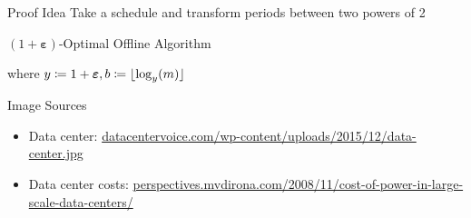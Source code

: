 \documentclass{beamer}
\DeclarePairedDelimiter\floor{\lfloor}{\rfloor}
\newcommand{\beps}{\boldsymbol\varepsilon}
\begin{document}
\begin{frame}{Proof Idea}
\centering Take a schedule and transform periods between two powers of 2

\pause\begin{figure}
	
\end{figure}
\end{frame}
\begin{frame}{$(1+\beps)$-Optimal Offline Algorithm}
\begin{figure}
	
\end{figure}
\centering where $y\coloneqq1+\beps,b\coloneqq\floor{\log_y(m)}$
\end{frame}
\begin{frame}[allowframebreaks]{Image Sources}
\begin{itemize}
\item Data center: \url{datacentervoice.com/wp-content/uploads/2015/12/data-center.jpg}
\item Data center costs: \url{perspectives.mvdirona.com/2008/11/cost-of-power-in-large-scale-data-centers/}
\end{itemize}
\end{frame}
\end{document}
